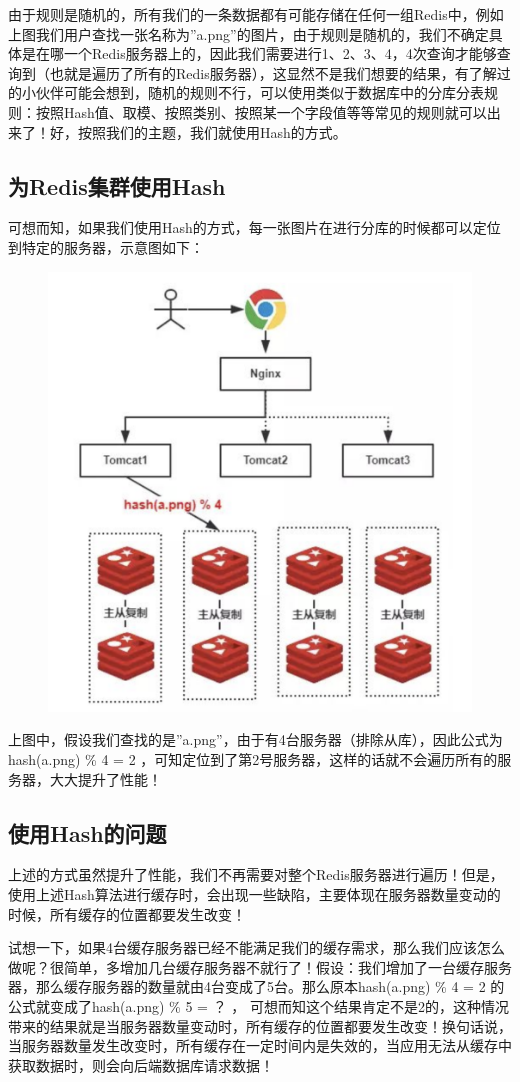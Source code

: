\documentclass[12pt]{article}
\begin{document}
由于规则是随机的，所有我们的一条数据都有可能存储在任何一组Redis中，例如上图我们用户查找一张名称为”a.png”的图片，由于规则是随机的，我们不确定具体是在哪一个Redis服务器上的，因此我们需要进行1、2、3、4，4次查询才能够查询到（也就是遍历了所有的Redis服务器），这显然不是我们想要的结果，有了解过的小伙伴可能会想到，随机的规则不行，可以使用类似于数据库中的分库分表规则：按照Hash值、取模、按照类别、按照某一个字段值等等常见的规则就可以出来了！好，按照我们的主题，我们就使用Hash的方式。

\subsection{为Redis集群使用Hash}
可想而知，如果我们使用Hash的方式，每一张图片在进行分库的时候都可以定位到特定的服务器，示意图如下：
\begin{figure}[H]
    \centering
    \includegraphics[width=.4\textwidth]{fig/Consistent_Hashing_3.png}
\end{figure}

上图中，假设我们查找的是”a.png”，由于有4台服务器（排除从库），因此公式为hash(a.png) \% 4 = 2 ，可知定位到了第2号服务器，这样的话就不会遍历所有的服务器，大大提升了性能！

\subsection{使用Hash的问题}
上述的方式虽然提升了性能，我们不再需要对整个Redis服务器进行遍历！但是，使用上述Hash算法进行缓存时，会出现一些缺陷，主要体现在服务器数量变动的时候，所有缓存的位置都要发生改变！

试想一下，如果4台缓存服务器已经不能满足我们的缓存需求，那么我们应该怎么做呢？很简单，多增加几台缓存服务器不就行了！假设：我们增加了一台缓存服务器，那么缓存服务器的数量就由4台变成了5台。那么原本hash(a.png) \% 4 = 2 的公式就变成了hash(a.png) \% 5 = ？ ， 可想而知这个结果肯定不是2的，这种情况带来的结果就是当服务器数量变动时，所有缓存的位置都要发生改变！换句话说，当服务器数量发生改变时，所有缓存在一定时间内是失效的，当应用无法从缓存中获取数据时，则会向后端数据库请求数据！
\end{document}
